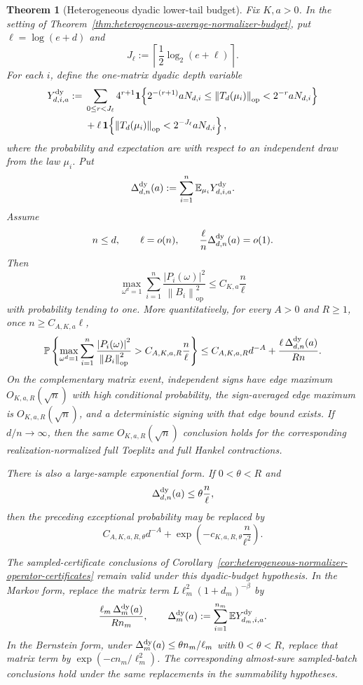 \documentclass[11pt]{amsart}
\numberwithin{equation}{section}
\newtheorem{theorem}{Theorem}[section]
\theoremstyle{definition}
\theoremstyle{remark}
\newcommand{\op}{\mathrm{op}}
\newcommand{\Prob}{\mathbb P}
\newcommand{\Exp}{\mathbb E}
\newcommand{\norm}[1]{\left\lVert #1\right\rVert}
\newcommand{\abs}[1]{\left\lvert #1\right\rvert}
\begin{document}
\begin{theorem}[Heterogeneous dyadic lower-tail budget]
\label{thm:heterogeneous-dyadic-normalizer-budget}
Fix \(K,a>0\).  In the setting of
Theorem~\ref{thm:heterogeneous-average-normalizer-budget}, put
\(\ell=\log(e+d)\) and
\[
  J_\ell:=\left\lceil \frac12\log_2(e+\ell)\right\rceil .
\]
For each \(i\), define the one-matrix dyadic depth variable
\[
\begin{aligned}
  Y_{d,i,a}^{\rm dy}:={}&
  \sum_{0\le r<J_\ell}4^{r+1}
  \mathbf 1\!\left\{
  2^{-(r+1)}aN_{d,i}\le \norm{T_d(\mu_i)}_{\op}
  <2^{-r}aN_{d,i}
  \right\} \\
  &+\ell\,
  \mathbf 1\!\left\{
  \norm{T_d(\mu_i)}_{\op}<2^{-J_\ell}aN_{d,i}
  \right\},
\end{aligned}
\]
where the probability and expectation are with respect to an independent draw
from the law \(\mu_i\).  Put
\[
  \Delta_{d,n}^{\rm dy}(a):=
  \sum_{i=1}^n \Exp_{\mu_i}Y_{d,i,a}^{\rm dy}.
\]
Assume
\[
  n\le d,\qquad \ell=o(n),\qquad
  \frac{\ell}{n}\Delta_{d,n}^{\rm dy}(a)=o(1).
\]
Then
\[
  \max_{\omega^d=1}
  \sum_{i=1}^n
  \frac{\abs{P_i(\omega)}^2}{\norm{B_i}_{\op}^2}
  \le C_{K,a}\frac n\ell
\]
with probability tending to one.  More quantitatively, for every \(A>0\) and
\(R\ge1\), once \(n\ge C_{A,K,a}\ell\),
\[
\begin{aligned}
  \Prob\left\{
  \max_{\omega^d=1}
  \sum_{i=1}^n
  \frac{\abs{P_i(\omega)}^2}{\norm{B_i}_{\op}^2}
  > C_{A,K,a,R}\frac n\ell
  \right\}
  \le
  C_{A,K,a,R}d^{-A}
  +\frac{\ell\,\Delta_{d,n}^{\rm dy}(a)}{Rn}.
\end{aligned}
\]
On the complementary matrix event, independent signs have edge maximum
\(O_{K,a,R}(\sqrt n)\) with high conditional probability, the sign-averaged
edge maximum is \(O_{K,a,R}(\sqrt n)\), and a deterministic signing with that
edge bound exists.  If \(d/n\to\infty\), then the same
\(O_{K,a,R}(\sqrt n)\) conclusion holds for the corresponding
realization-normalized full Toeplitz and full Hankel contractions.

There is also a large-sample exponential form.  If \(0<\theta<R\) and
\[
  \Delta_{d,n}^{\rm dy}(a)\le \theta\frac n\ell ,
\]
then the preceding exceptional probability may be replaced by
\[
  C_{A,K,a,R,\theta}d^{-A}
  +\exp\left(-c_{K,a,R,\theta}\frac n{\ell^2}\right).
\]

The sampled-certificate conclusions of
Corollary~\ref{cor:heterogeneous-normalizer-operator-certificates} remain valid
under this dyadic-budget hypothesis.  In the Markov form, replace the matrix
term \(L\ell_m^2(1+d_m)^{-\beta}\) by
\[
  \frac{\ell_m\,\Delta_m^{\rm dy}(a)}{R n_m},
  \qquad
  \Delta_m^{\rm dy}(a):=
  \sum_{i=1}^{n_m}\Exp Y_{d_m,i,a}^{\rm dy}.
\]
In the Bernstein form, under
\(\Delta_m^{\rm dy}(a)\le\theta n_m/\ell_m\) with \(0<\theta<R\), replace that
matrix term by \(\exp(-c n_m/\ell_m^2)\).  The corresponding almost-sure
sampled-batch conclusions hold under the same replacements in the summability
hypotheses.
\end{theorem}
\end{document}
